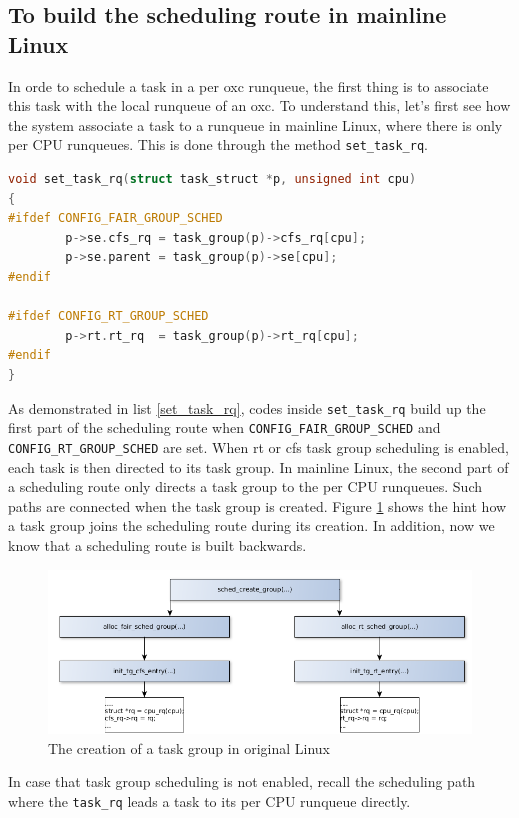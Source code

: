 \subsection{To build the scheduling route in mainline Linux}
In orde to schedule a task in a per oxc runqueue, the first thing is to 
associate this task with the local runqueue of an oxc. To understand this,
let's first see how the system associate a task to a runqueue in 
mainline Linux, where there is only per CPU runqueues. This is done through
the method \texttt{set\_task\_rq}.
\begin{lstlisting}[language=C, label={set_task_rq},
	caption={To associate tasks with a per CPU runqueue in mainline Linux}]
void set_task_rq(struct task_struct *p, unsigned int cpu)
{
#ifdef CONFIG_FAIR_GROUP_SCHED
        p->se.cfs_rq = task_group(p)->cfs_rq[cpu];
        p->se.parent = task_group(p)->se[cpu];
#endif

#ifdef CONFIG_RT_GROUP_SCHED
        p->rt.rt_rq  = task_group(p)->rt_rq[cpu];
#endif
}
\end{lstlisting}
As demonstrated in list \ref{set_task_rq},  codes inside \texttt{set\_task\_rq}
build up the first part of the scheduling route 
when \texttt{CONFIG\_FAIR\_GROUP\_SCHED} and 
\texttt{CONFIG\_RT\_GROUP\_SCHED} are set.
When rt or cfs task group scheduling is enabled, each task is then directed 
to its task group. In mainline Linux, the second part of a scheduling route
only directs a task group to the per CPU runqueues. Such paths are connected 
when the task group is created. Figure \ref{fig:tg_creation} shows the hint how 
a task group joins the scheduling route during its creation. In addition, now 
we know that a scheduling route is built backwards.
\begin{figure}[htbp]
        \centering
        \includegraphics[width=\textwidth]{images/tg_creation}
        \caption{The creation of a task group in original Linux}
        \label{fig:tg_creation}
\end{figure}
In case that task group scheduling is not enabled, recall the scheduling path
where the \texttt{task\_rq} leads a task to its per CPU runqueue directly.


